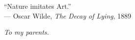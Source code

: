 \cleardoublepage
\thispagestyle{empty}

\vspace*{3cm}

\begin{raggedleft}
``Nature imitates Art.'' \\
--- Oscar Wilde, \textit{The Decay of Lying}, 1889 \\
\end{raggedleft}

\vspace{4cm}

\begin{center}
\textit{To my parents.}
\end{center}
